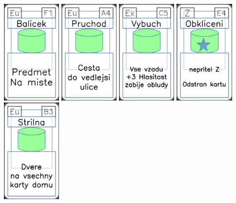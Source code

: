 \documentclass[a4paper]{article}
\begin{document}
	\includegraphics[width=3.0cm]{img-4_25}
	\includegraphics[width=3.0cm]{img-4_33}
	\includegraphics[width=3.0cm]{img-4_14}
	\includegraphics[width=3.0cm]{img-5_53}
	\includegraphics[width=3.0cm]{img-4_37}
\end{document}
